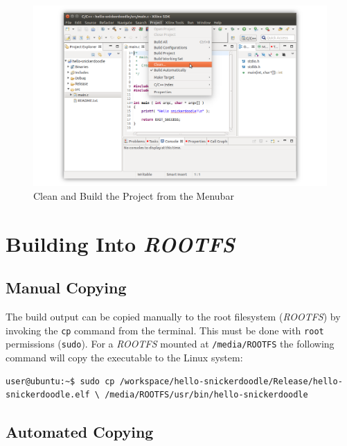 \begin{figure}[h]
	\centering
	\includegraphics{images/Project_Clean.png}
	\caption{Clean and Build the Project from the Menubar}
	\label{fig:cleanbuild}
\end{figure}


\section{Building Into \textit{ROOTFS}}


\subsection{Manual Copying}

The build output can be copied manually to the root filesystem (\textit{ROOTFS}) by invoking the \texttt{cp} command from the terminal. This must be done with \texttt{root} permissions (\texttt{sudo}). For a \textit{ROOTFS} mounted at \texttt{/media/ROOTFS} the following command will copy the executable to the Linux system: \\

\begin{fullwidth}
\begin{lstlisting}
user@ubuntu:~$ sudo cp /workspace/hello-snickerdoodle/Release/hello-snickerdoodle.elf \ /media/ROOTFS/usr/bin/hello-snickerdoodle
\end{lstlisting}
\end{fullwidth}



\subsection{Automated Copying}

